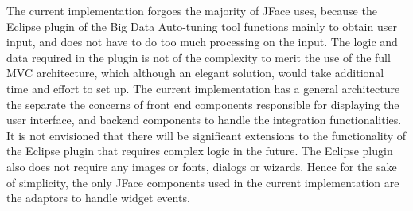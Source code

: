 The current implementation forgoes the majority of JFace uses, because the Eclipse plugin of the Big Data Auto-tuning tool functions mainly to obtain user input, and does not have to do too much processing on the input. The logic and data required in the plugin is not of the complexity to merit the use of the full MVC architecture, which although an elegant solution, would take additional time and effort to set up. The current implementation has a general architecture the separate the concerns of front end components responsible for displaying the user interface, and backend components to handle the integration functionalities. It is not envisioned that there will be significant extensions to the functionality of the Eclipse plugin that requires complex logic in the future. The Eclipse plugin also does not require any images or fonts, dialogs or wizards. Hence for the sake of simplicity, the only JFace components used in the current implementation are the adaptors to handle widget events.\\

